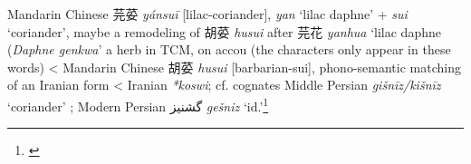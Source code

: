 \begin{etymology}\label{ety:yansui}
Mandarin Chinese {芫荽} \textit{yánsuī} [lilac-coriander], \textit{yan} `lilac daphne' + \textit{sui} `coriander', maybe a remodeling of 胡荽 \textit{husui} after 芫花 \textit{yanhua} `lilac daphne (\textit{Daphne genkwa}' a herb in TCM, on accou (the characters only appear in these words)
< Mandarin Chinese {胡荽} \textit{husui} [barbarian-sui], phono-semantic matching of an Iranian form
< Iranian \textit{*koswi}; cf. cognates Middle Persian \textit{gišnīz/kišnīz} `coriander'  ; Modern Persian گشنیز‎ \textit{gešniz} `id.'\footnote{\textcite{laufer_sino-iranica_1919}}
\end{etymology}